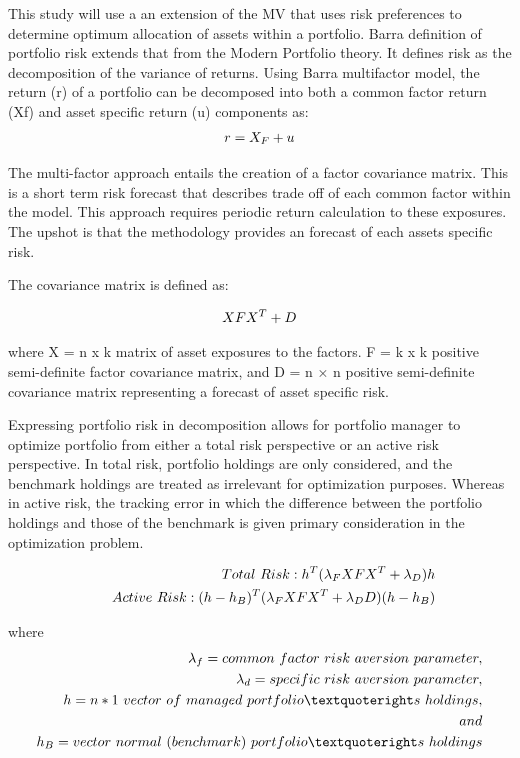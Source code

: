\documentclass[12pt,preprint, authoryear]{elsarticle}
\numberwithin{equation}{section}
\numberwithin{figure}{section}
\numberwithin{table}{section}
\begin{document}
This study will use a an extension of the MV that uses risk preferences
to determine optimum allocation of assets within a portfolio. Barra
definition of portfolio risk extends that from the Modern Portfolio
theory. It defines risk as the decomposition of the variance of returns.
Using Barra multifactor model, the return (r) of a portfolio can be
decomposed into both a common factor return (Xf) and asset specific
return (u) components as: \begin{align} 
r= X_{F} + u \notag
\end{align}

The multi-factor approach entails the creation of a factor covariance
matrix. This is a short term risk forecast that describes trade off of
each common factor within the model. This approach requires periodic
return calculation to these exposures. The upshot is that the
methodology provides an forecast of each assets specific risk.

The covariance matrix is defined as:

\begin{align}
 XFX^T + D \label{eq1} \notag
\end{align}

where X = n x k matrix of asset exposures to the factors. F = k x k
positive semi-definite factor covariance matrix, and D = n × n positive
semi-definite covariance matrix representing a forecast of asset
specific risk.

Expressing portfolio risk in decomposition allows for portfolio manager
to optimize portfolio from either a total risk perspective or an active
risk perspective. In total risk, portfolio holdings are only considered,
and the benchmark holdings are treated as irrelevant for optimization
purposes. Whereas in active risk, the tracking error in which the
difference between the portfolio holdings and those of the benchmark is
given primary consideration in the optimization problem.

\begin{align}
Total\ Risk : h^T(\lambda_FXFX^T + \lambda_D)h \notag \\ \quad \quad 
Active \ Risk : (h-h_B)^T(\lambda_FXFX^T+\lambda_DD)(h-h_B) \notag
\end{align}

where \begin{align}
\lambda_f  =  common \ factor\ risk\ aversion\ parameter \notag,\\ \lambda_d =  specific\ risk\ aversion\ parameter \notag,\\h  =  n * 1 \ vector\ of\ managed\ portfolio’s\ holdings\notag,\\ and \notag \\h_B = vector \ normal\ (benchmark)\ portfolio’s\ holdings \notag 
\end{align}
\end{document}

